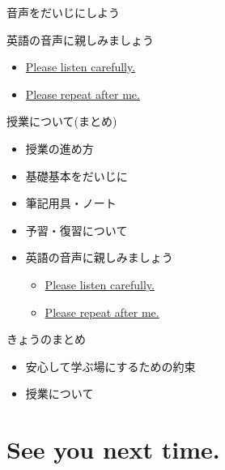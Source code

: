 \documentclass[
  ignorenonframetext,
  aspectratio=169,
  xcolor=dvipsnames]{beamer}
\providecommand{\tightlist}{%
  \setlength{\itemsep}{0pt}\setlength{\parskip}{0pt}}
\begin{document}
\begin{frame}{音声をだいじにしよう}
\protect{}\label{ux97f3ux58f0ux3092ux3060ux3044ux3058ux306bux3057ux3088ux3046}
\LARGE

英語の音声に親しみましょう

\begin{itemize}[<+->]
\tightlist
\item
  \href{./audio/listen.mp3}{Please listen carefully.}
\item
  \href{./audio/repeat.mp3}{Please repeat after me.}
\end{itemize}
\end{frame}

\begin{frame}{授業について(まとめ)}
\protect{}\label{ux6388ux696dux306bux3064ux3044ux3066ux307eux3068ux3081}
\Large

\begin{itemize}
\item 授業の進め方
\item 基礎基本をだいじに
\item 筆記用具・ノート
\item 予習・復習について
\item 英語の音声に親しみましょう
      \begin{itemize}
         \item  \href{./audio/listen.mp3}{Please listen carefully.}
         \item  \href{./audio/repeat.mp3}{Please repeat after me.}
      \end{itemize}
\end{itemize}
\end{frame}

\begin{frame}{きょうのまとめ}
\protect{}\label{ux304dux3087ux3046ux306eux307eux3068ux3081}
\LARGE

\begin{itemize}
\item  安心して学ぶ場にするための約束
\item  授業について
\end{itemize}
\end{frame}

\section{See you next time.}\label{see-you-next-time.}

\begin{frame}{}
\protect{}\label{section-3}
\end{frame}
\end{document}
